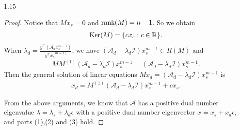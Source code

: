 \documentclass[preprint,12pt]{elsarticle}
\begin{document}
\begin{spacing}{1.15}
\begin{proof}
Notice that $Mx_s=0$ and ${\rm rank}(M)=n-1$. So we obtain
\begin{eqnarray*}
{\rm Ker}(M)=\{cx_s:c\in\mathbb{R}\}.
\end{eqnarray*}
When $\lambda_d=\frac{y^\top(\mathcal{A}_dx_s^{m-1})}{y^\top x_s^{[m-1]}}$, we have $(\mathcal{A}_d-\lambda_d\mathcal{I})x_s^{m-1}\in R(M)$ and
\begin{eqnarray*}
MM^{(1)}(\mathcal{A}_d-\lambda_d\mathcal{I})x_s^{m-1}=(\mathcal{A}_d-\lambda_d\mathcal{I})x_s^{m-1}.
\end{eqnarray*}
Then the general solution of linear equations $Mx_d=(\mathcal{A}_d-\lambda_d\mathcal{I})x_s^{m-1}$ is
\begin{eqnarray*}
x_d=M^{(1)}(\mathcal{A}_d-\lambda_d\mathcal{I})x_s^{m-1}+cx_s.
\end{eqnarray*}

From the above arguments, we know that $\mathcal{A}$ has a positive dual number eigenvalue $\lambda=\lambda_s+\lambda_d\epsilon$ with a positive dual number eigenvector $x=x_s+x_d\epsilon$, and parts (1),(2) and (3) hold.


\end{proof}
\end{spacing}
\end{document}
